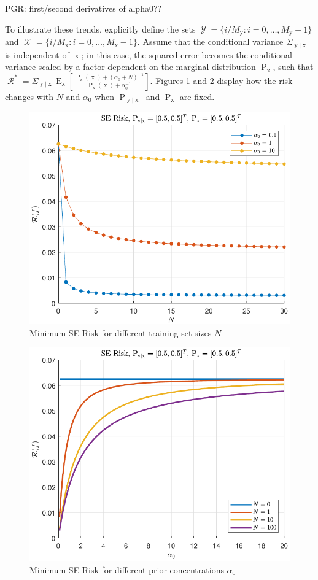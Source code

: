 \documentclass[12pt]{report}
\DeclareMathOperator{\xrm}{\mathrm{x}}
\DeclareMathOperator{\yrm}{\mathrm{y}}
\DeclareMathOperator{\Prm}{\mathrm{P}}
\DeclareMathOperator{\Erm}{\mathrm{E}}
\DeclareMathOperator{\Xcal}{\mathcal{X}}
\DeclareMathOperator{\Ycal}{\mathcal{Y}}
\DeclareMathOperator{\Rcal}{\mathcal{R}}
\begin{document}
PGR: first/second derivatives of alpha0??

To illustrate these trends, explicitly define the sets $\Ycal = \{ i/M_{\yrm} : i = 0,\ldots,M_{\yrm}-1 \}$ and $\Xcal = \{ i/M_{\xrm} : i = 0,\ldots,M_{\xrm}-1 \}$. Assume that the conditional variance $\Sigma_{\yrm | \xrm}$ is independent of $\xrm$; in this case, the squared-error becomes the conditional variance scaled by a factor dependent on the marginal distribution $\Prm_{\xrm}$, such that $\Rcal^* = \Sigma_{\yrm | \xrm} \Erm_{\xrm} \left[ \frac{\Prm_{\xrm}(\xrm) + (\alpha_0+N)^{-1}}{\Prm_{\xrm}(\xrm) + \alpha_0^{-1}} \right]$.  Figures \ref{fig:Risk_SE_Dir_IO_N_leg_a0} and \ref{fig:Risk_SE_Dir_IO_a0_leg_N} display how the risk changes with $N$ and $\alpha_0$ when $\Prm_{\yrm | \xrm}$ and $\Prm_{\xrm}$ are fixed.

\begin{figure}
\centering
\includegraphics[width=0.7\linewidth]{Risk_SE_Dir_IO_N_leg_a0.pdf}
\caption{Minimum SE Risk for different training set sizes $N$}
\label{fig:Risk_SE_Dir_IO_N_leg_a0}
\end{figure}

\begin{figure}
\centering
\includegraphics[width=0.7\linewidth]{Risk_SE_Dir_IO_a0_leg_N.pdf}
\caption{Minimum SE Risk for different prior concentrations $\alpha_0$}
\label{fig:Risk_SE_Dir_IO_a0_leg_N}
\end{figure}
\end{document}
